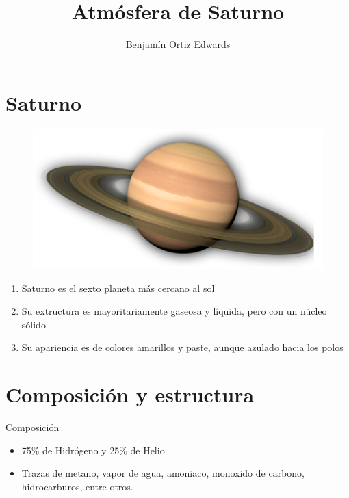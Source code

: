 \documentclass{beamer}
\title{Atmósfera de Saturno}
\author{Benjamín Ortiz Edwards}
\begin{document}
\frame{\titlepage}

\section{Saturno}

\begin{frame}


\vspace{-2cm}
\begin{figure}
    \centering
    \includegraphics[width=0.6\linewidth]{saturn}
\end{figure}
\begin{enumerate}
    \item Saturno es el sexto planeta más cercano al sol
    \item Su extructura es mayoritariamente gaseosa y líquida, pero con un núcleo sólido
    \item Su apariencia es de colores amarillos y paste, aunque azulado hacia los polos
\end{enumerate}
\end{frame}


\section{Composición y estructura}
\begin{frame}{Composición}
    \begin{itemize}
        \item 75\% de Hidrógeno y 25\% de Helio.
        \item Trazas de	metano, vapor de agua, amoniaco, monoxido de carbono, hidrocarburos, entre otros.	
    \end{itemize}
\end{frame}
\end{document}
